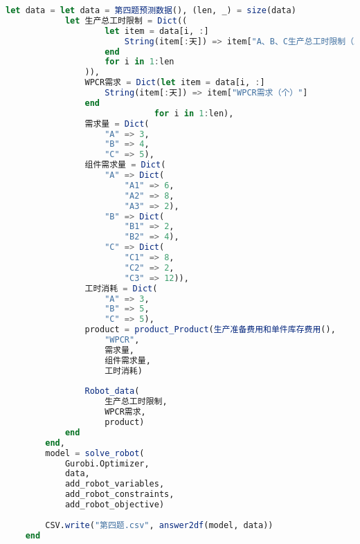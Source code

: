 \begin{appendices}
\begin{lstlisting}[language=julia]
    let data = let data = 第四题预测数据(), (len, _) = size(data)
            let 生产总工时限制 = Dict((
                    let item = data[i, :]
                        String(item[:天]) => item["A、B、C生产总工时限制（工时）"]
                    end
                    for i in 1:len
                )),
                WPCR需求 = Dict(let item = data[i, :]
                    String(item[:天]) => item["WPCR需求（个）"]
                end
                              for i in 1:len),
                需求量 = Dict(
                    "A" => 3,
                    "B" => 4,
                    "C" => 5),
                组件需求量 = Dict(
                    "A" => Dict(
                        "A1" => 6,
                        "A2" => 8,
                        "A3" => 2),
                    "B" => Dict(
                        "B1" => 2,
                        "B2" => 4),
                    "C" => Dict(
                        "C1" => 8,
                        "C2" => 2,
                        "C3" => 12)),
                工时消耗 = Dict(
                    "A" => 3,
                    "B" => 5,
                    "C" => 5),
                product = product_Product(生产准备费用和单件库存费用(),
                    "WPCR",
                    需求量,
                    组件需求量,
                    工时消耗)
    
                Robot_data(
                    生产总工时限制,
                    WPCR需求,
                    product)
            end
        end,
        model = solve_robot(
            Gurobi.Optimizer,
            data,
            add_robot_variables,
            add_robot_constraints,
            add_robot_objective)
    
        CSV.write("第四题.csv", answer2df(model, data))
    end
\end{lstlisting}
\end{appendices}